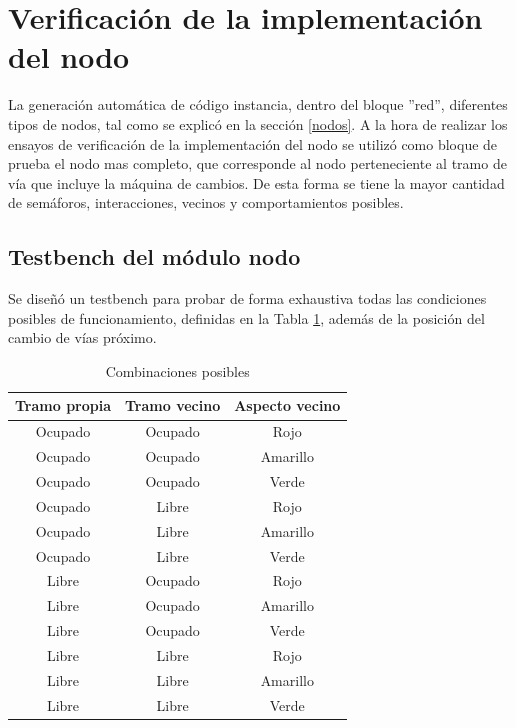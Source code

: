 \section{Verificación de la implementación del nodo}

	La generación automática de código instancia, dentro del bloque ''red'', diferentes tipos de nodos, tal como se explicó en la sección \ref{nodos}. A la hora de realizar los ensayos de verificación de la implementación del nodo se utilizó como bloque de prueba el nodo mas completo, que corresponde al nodo perteneciente al tramo de vía que incluye la máquina de cambios. De esta forma se tiene la mayor cantidad de semáforos, interacciones, vecinos y comportamientos posibles.
	
	\subsection{Testbench del módulo nodo}
			
			Se diseñó un testbench para probar de forma exhaustiva todas las condiciones posibles de funcionamiento, definidas en la Tabla \ref{tabla_nodos}, además de la posición del cambio de vías próximo.
					
			\begin{table}[!hbt]
			\renewcommand{\arraystretch}{1.3}
			\caption{Combinaciones posibles}
			\label{tabla_nodos}
			\centering
			\begin{tabular}{ c  c  c }
			\hline
			Tramo propia & Tramo vecino & Aspecto vecino \\	
			\hline
			Ocupado & Ocupado & Rojo  \\
			Ocupado & Ocupado & Amarillo  \\
			Ocupado & Ocupado & Verde  \\	
			Ocupado & Libre & Rojo  \\
			Ocupado & Libre & Amarillo  \\
			Ocupado & Libre & Verde  \\	
			Libre & Ocupado & Rojo  \\
			Libre & Ocupado & Amarillo  \\
			Libre & Ocupado & Verde  \\	
			Libre & Libre & Rojo  \\
			Libre & Libre & Amarillo  \\
			Libre & Libre & Verde  \\	
			\end{tabular}
			\end{table}	
	
